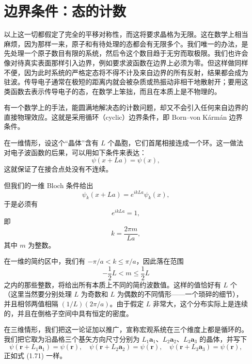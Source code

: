 \section{边界条件：态的计数}

以上这一切都假定了完全的平移对称性，而这将要求晶格为无限。这在数学上相当麻烦，因为那样一来，原子和有待处理的态都会有无限多个。我们唯一的办法，是先处理一个原子数目有限的系统，然后令这个数目趋于无穷而取极限。我们也许会像对待真实表面那样引入边界，例如要求波函数在边界上必须为零。但这样做同样不便，因为此时系统的严格定态将不得不计及来自边界的所有反射，结果都会成为驻波。传导电子通常在极短的距离内就会被杂质或热振动非相干地散射开；要用这类函数去表示传导电子的态，在数学上笨拙，而且在本质上是不物理的。


有一个数学上的手法，能圆满地解决态的计数问题，却又不会引入任何来自边界的直接物理效应。这就是采用循环（cyclic）边界条件，即 Born–von Kármán 边界条件。

在一维情形，设这个“晶体”含有 $L$ 个晶胞，它们首尾相接连成一个环。这一做法对电子波函数的后果，可以用如下条件来表达：
\begin{equation*}
\psi(x+La)=\psi(x),
\tag{1.71}
\end{equation*}
这就保证了在接合点处没有不连续。

但我们的一维 Bloch 条件给出
\begin{equation*}
\psi_k(x+La)=e^{ikLa}\psi_k(x),
\tag{1.72}
\end{equation*}
于是必须有
\begin{equation*}
e^{ikLa}=1,
\tag{1.73}
\end{equation*}
即
\begin{equation*}
k=\frac{2\pi m}{La},
\tag{1.74}
\end{equation*}
其中 $m$ 为整数。

在一维的简约区中，我们有 $-\pi/a<k\leqslant\pi/a$，因此落在范围
\begin{equation*}
-\frac{1}{2}L<m\leqslant\frac{1}{2}L
\tag{1.75}
\end{equation*}
之内的那些整数，将给出所有本质上不同的简约波数值。这样的值恰好有 $L$ 个（这里当然要分别处理 $L$ 为奇数和 $L$ 为偶数的不同情形——一个琐碎的细节），并且相邻两值相隔 $(1/L)(2\pi/a)$。由于假定 $L$ 非常大，这个分布实际上是连续的，并且在倒格子空间中具有恒定的密度。

在三维情形，我们把这一论证加以推广，宣称宏观系统在三个维度上都是循环的。我们把它取为沿晶格三个基矢方向尺寸分别为 $L_1\mathbf{a}_1$、$L_2\mathbf{a}_2$、$L_3\mathbf{a}_3$ 的晶体，并写下
\begin{equation*}
\psi(\mathbf{r}+L_1\mathbf{a}_1)=\psi(\mathbf{r}),\quad
\psi(\mathbf{r}+L_2\mathbf{a}_2)=\psi(\mathbf{r}),\quad
\psi(\mathbf{r}+L_3\mathbf{a}_3)=\psi(\mathbf{r}),
\tag{1.76}
\end{equation*}
正如式 (1.71) 一样。

